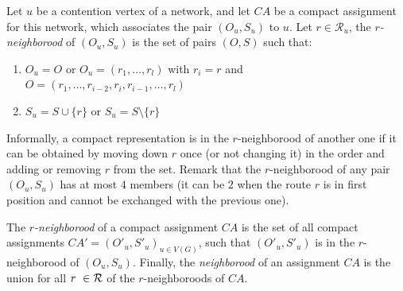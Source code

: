 \documentclass[english]{article}
\begin{document}
Let $u$ be a contention vertex of a network, and let $CA$ be a compact assignment for this network, 
 which associates the pair $(O_u,S_u)$ to $u$. Let $r \in \mathcal{R}_u$, the \emph{$r$-neighborood} of $(O_u,S_u)$ is the set of pairs $(O,S)$ such that:
 
 \begin{enumerate} 
 \item $O_u = O$ or $O_u = (r_1,\dots,r_l)$ with $r_i = r$ and $O = (r_1,\dots,r_{i-2},r_{i},r_{i-1},\dots,r_{l})$ 
 \item $S_u = S \cup \{r\}$ or  $S_u = S \setminus \{r\}$ 
 \end{enumerate}

Informally, a compact representation is in the $r$-neighborood of another one if it can be obtained by 
moving down $r$ once (or not changing it) in the order and adding or removing $r$ from the set. 
Remark that the $r$-neighborood of any pair $(O_u,S_u)$ has at most $4$ members (it can be $2$ when the route $r$ is in first position and cannot be exchanged with the previous one). 

The \emph{$r$-neighborood} of a compact assignment $CA$ is the set of all compact assignments $CA'=(O'_u,S'_u)_{u \in V(G)}$, such that  $(O'_u,S'_u)$ is in the $r$-neighborood of $(O_u,S_u)$. Finally, the \emph{neighborood} of an assignment $CA$ is the union for all $r \in \cal{R}$ of the 
 $r$-neighboroods of $CA$.

% 
% 
% 
% 
% 
\end{document}

